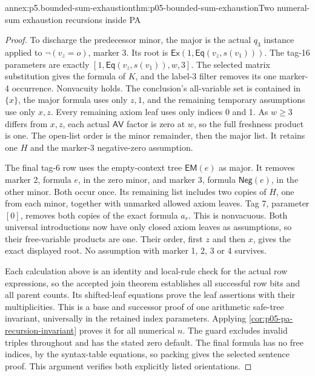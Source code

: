 \begin{annexitem}{annex:p5.bounded-sum-exhaustion}{thm:p05-bounded-sum-exhaustion}{Two numeral-sum exhaustion recursions inside PA}
\begin{proof}
To discharge the predecessor minor, the major is the actual \(q_3\)
instance applied to \(\neg(v_z=o)\), marker 3. Its root is
\(\mathsf{Ex}(1,\mathsf{Eq}(v_z,s(v_1)))\). The tag-16
parameters are exactly \([1,\mathsf{Eq}(v_z,s(v_1)),w,3]\).
The selected matrix substitution gives the formula of \(K\), and
the label-3 filter removes its one marker-4 occurrence. Nonvacuity holds.
The conclusion's all-variable set is contained in \(\{x\}\),
the major formula uses only \(z,1\), and the remaining temporary
assumptions use only \(x,z\). Every remaining axiom leaf uses only
indices 0 and 1. As \(w\geq3\) differs from \(x,z\), each actual
\(\mathsf{AV}\) factor is zero at \(w\), so the full freshness
product is one. The open-list order is the minor remainder, then the
major list. It retains one \(H\) and the marker-3 negative-zero
assumption.

The final tag-6 row uses the empty-context tree \(\mathsf{EM}(e)\)
as major. It removes marker 2, formula \(e\), in the zero minor,
and marker 3, formula \(\mathsf{Neg}(e)\), in the other minor.
Both occur once. Its remaining list includes two copies of \(H\),
one from each minor, together with unmarked allowed axiom leaves. Tag 7,
parameter \([0]\), removes both copies of the exact formula \(a_r\).
This is nonvacuous. Both universal introductions now have only closed
axiom leaves as assumptions, so their free-variable products are one.
Their order, first \(z\) and then \(x\), gives the exact displayed
root. No assumption with marker 1, 2, 3 or 4 survives.

Each calculation above is an identity and local-rule check for the actual
row expressions, so the accepted join theorem establishes all successful
row bits and all parent counts. Its shifted-leaf equations prove the leaf
assertions with their multiplicities. This is a base and successor proof
of one arithmetic safe-tree invariant, universally in the retained index
parameters. Applying \cref{cor:p05-pa-recursion-invariant} proves it
for all numerical \(n\). The guard excludes invalid triples throughout
and has the stated zero default. The final formula has no free indices,
by the syntax-table equations, so packing gives the selected sentence
proof. This argument verifies both explicitly listed orientations.
\end{proof}
\end{annexitem}

